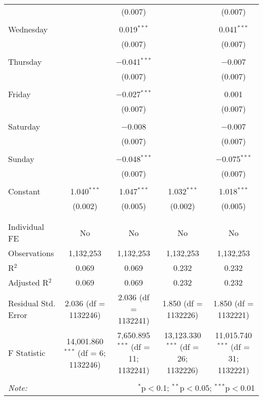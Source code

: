 \documentclass[
]{article}
\begin{document}
\begin{table}[!htbp]
{\begin{tabular}{@{\extracolsep{5pt}}lcccc}
  &  & (0.007) &  & (0.007) \\ 
  & & & & \\ 
 Wednesday &  & 0.019$^{***}$ &  & 0.041$^{***}$ \\ 
  &  & (0.007) &  & (0.007) \\ 
  & & & & \\ 
 Thursday &  & $-$0.041$^{***}$ &  & $-$0.007 \\ 
  &  & (0.007) &  & (0.007) \\ 
  & & & & \\ 
 Friday &  & $-$0.027$^{***}$ &  & 0.001 \\ 
  &  & (0.007) &  & (0.007) \\ 
  & & & & \\ 
 Saturday &  & $-$0.008 &  & $-$0.007 \\ 
  &  & (0.007) &  & (0.007) \\ 
  & & & & \\ 
 Sunday &  & $-$0.048$^{***}$ &  & $-$0.075$^{***}$ \\ 
  &  & (0.007) &  & (0.007) \\ 
  & & & & \\ 
 Constant & 1.040$^{***}$ & 1.047$^{***}$ & 1.032$^{***}$ & 1.018$^{***}$ \\ 
  & (0.002) & (0.005) & (0.002) & (0.005) \\ 
  & & & & \\ 
\hline \\[-1.8ex] 
Individual FE & No & No & No & No \\ 
Observations & 1,132,253 & 1,132,253 & 1,132,253 & 1,132,253 \\ 
R$^{2}$ & 0.069 & 0.069 & 0.232 & 0.232 \\ 
Adjusted R$^{2}$ & 0.069 & 0.069 & 0.232 & 0.232 \\ 
Residual Std. Error & 2.036 (df = 1132246) & 2.036 (df = 1132241) & 1.850 (df = 1132226) & 1.850 (df = 1132221) \\ 
F Statistic & 14,001.860$^{***}$ (df = 6; 1132246) & 7,650.895$^{***}$ (df = 11; 1132241) & 13,123.330$^{***}$ (df = 26; 1132226) & 11,015.740$^{***}$ (df = 31; 1132221) \\ 
\hline 
\hline \\[-1.8ex] 
\textit{Note:}  & \multicolumn{4}{r}{$^{*}$p$<$0.1; $^{**}$p$<$0.05; $^{***}$p$<$0.01} \\ 
\end{tabular}
} 
\end{table} 
\newpage
\end{document}
